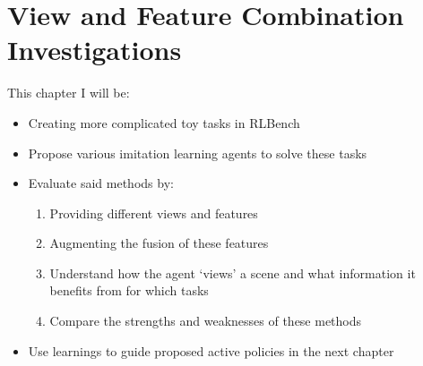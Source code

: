 \chapter{View and Feature Combination Investigations}\label{ch:view-comb}
This chapter I will be:
\begin{itemize}
  \item Creating more complicated toy tasks in RLBench
  \item Propose various imitation learning agents to solve these tasks
  \item Evaluate said methods by:
  \begin{enumerate}
    \item Providing different views and features
    \item Augmenting the fusion of these features
    \item Understand how the agent `views' a scene and what information it benefits from for which tasks
    \item Compare the strengths and weaknesses of these methods
  \end{enumerate}
  \item Use learnings to guide proposed active policies in the next chapter 
  
\end{itemize}












